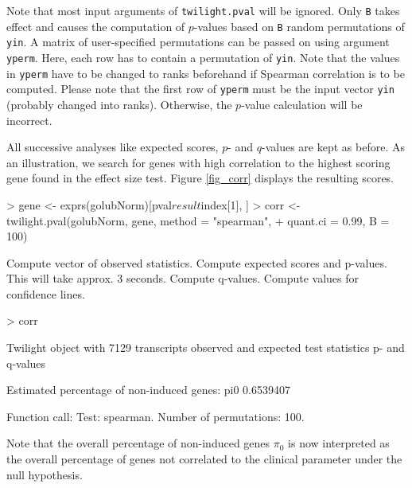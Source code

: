 \documentclass[11pt,a4paper,fleqn]{report}
\newcommand{\Rfunction}[1]{{\texttt{#1}}}
\newcommand{\Rfunarg}[1]{{\texttt{#1}}}
\begin{document}
Note that most input arguments of \Rfunction{twilight.pval} will be ignored. Only \Rfunarg{B} takes effect and causes the computation of $p$-values based on \Rfunarg{B} random permutations of \Rfunarg{yin}. A matrix of user-specified permutations can be passed on using argument \Rfunarg{yperm}. Here, each row has to contain a permutation of \Rfunarg{yin}. Note that the values in \Rfunarg{yperm} have to be changed to ranks beforehand if Spearman correlation is to be computed. Please note that the first row of \Rfunarg{yperm} must be the input vector \Rfunarg{yin} (probably changed into ranks). Otherwise, the $p$-value calculation will be incorrect.

All successive analyses like expected scores, $p$- and $q$-values are kept as before. As an illustration, we search for genes with high correlation to the highest scoring gene found in the effect size test. Figure \ref{fig_corr} displays the resulting scores.

\begin{Schunk}
\begin{Sinput}
> gene <- exprs(golubNorm)[pval$result$index[1], ]
> corr <- twilight.pval(golubNorm, gene, method = "spearman", 
+     quant.ci = 0.99, B = 100)
\end{Sinput}
\begin{Soutput}
Compute vector of observed statistics. 
Compute expected scores and p-values. This will take approx. 3 seconds. 
Compute q-values. 
Compute values for confidence lines. 
\end{Soutput}
\begin{Sinput}
> corr
\end{Sinput}
\begin{Soutput}
 Twilight object with
     7129 transcripts
     observed and expected test statistics
     p- and q-values

 Estimated percentage of non-induced genes:
      pi0 
0.6539407 

 Function call:
 Test: spearman. Number of permutations: 100. 
\end{Soutput}
\end{Schunk}

Note that the overall percentage of non-induced genes $\pi_0$ is now interpreted as the overall percentage of genes not correlated to the clinical parameter under the null hypothesis.
\end{document}
